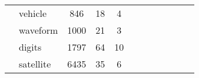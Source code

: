 \begin{tabular}{l l C{0.6\tblw} C{0.6\tblw} C{0.6\tblw} C{0.6\tblw} C{0.6\tblw}  C{0.6\tblw}  C{0.6\tblw} C{0.6\tblw}  C{0.6\tblw}  C{0.6\tblw}}
& \sc vehicle & 846 & 18 & 4 &  &  &  &  \\
& \sc waveform & 1000 & 21 & 3 &  &  &  &  \\
& \sc digits & 1797 & 64 & 10 &  &  &  &  \\
& \sc satellite & 6435 & 35 & 6 &  &  &  &  \\
\midrule
\bottomrule
\end{tabular}

